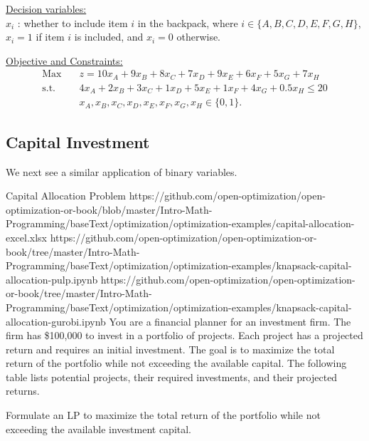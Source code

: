 \begin{solution}
\underline{Decision variables:} \\
$x_i$ : whether to include item $i$ in the backpack, where $i \in \{A, B, C, D, E, F, G, H\}$, $x_i = 1$ if item $i$ is included, and $x_i = 0$ otherwise.

\smallskip \underline{Objective and Constraints:}
\begin{align*}
\mbox{Max~~ } & z = 10x_A + 9x_B + 8x_C + 7x_D + 9x_E + 6x_F + 5x_G + 7x_H  \\
\mbox{s.t.~~} & 4x_A + 2x_B + 3x_C + 1x_D + 5x_E + 1x_F + 4x_G + 0.5x_H \le 20 \\
& x_A, x_B, x_C, x_D, x_E, x_F, x_G, x_H \in \{0,1\}.
\end{align*}
\end{solution}


\subsection{Capital Investment}
We next see a similar application of binary variables.
\begin{examplewithallcode}{Capital Allocation Problem}
{https://github.com/open-optimization/open-optimization-or-book/blob/master/Intro-Math-Programming/baseText/optimization/optimization-examples/capital-allocation-excel.xlsx}
{https://github.com/open-optimization/open-optimization-or-book/tree/master/Intro-Math-Programming/baseText/optimization/optimization-examples/knapsack-capital-allocation-pulp.ipynb}
{https://github.com/open-optimization/open-optimization-or-book/tree/master/Intro-Math-Programming/baseText/optimization/optimization-examples/knapsack-capital-allocation-gurobi.ipynb}
You are a financial planner for an investment firm. The firm has \$100,000 to invest in a portfolio of projects. Each project has a projected return and requires an initial investment. The goal is to maximize the total return of the portfolio while not exceeding the available capital. The following table lists potential projects, their required investments, and their projected returns.

Formulate an LP to maximize the total return of the portfolio while not exceeding the available investment capital.
\end{examplewithallcode}



